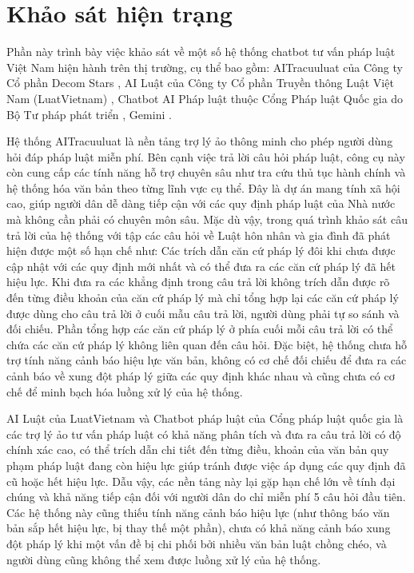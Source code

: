 \documentclass[../DoAn.tex]{subfiles}
\begin{document}
\section{Khảo sát hiện trạng}
\label{section:2.1}


Phần này trình bày việc khảo sát về một số hệ thống chatbot tư vấn pháp luật Việt Nam hiện hành trên thị trường, cụ thể bao gồm: AITracuuluat của Công ty Cổ phần Decom Stars \cite{AITracuuluatDoc}, AI Luật của Công ty Cổ phần Truyền thông Luật Việt Nam (LuatVietnam) \cite{AILuatLuatVietNamDoc}, Chatbot AI Pháp luật thuộc Cổng Pháp luật Quốc gia do Bộ Tư pháp phát triển \cite{PhapLuatGovChatbotDoc}, Gemini \cite{GeminiDoc}.


Hệ thống AITracuuluat là nền tảng trợ lý ảo thông minh cho phép người dùng hỏi đáp pháp luật miễn phí. Bên cạnh việc trả lời câu hỏi pháp luật, công cụ này còn cung cấp các tính năng hỗ trợ chuyên sâu như tra cứu thủ tục hành chính và hệ thống hóa văn bản theo từng lĩnh vực cụ thể. Đây là dự án mang tính xã hội cao, giúp người dân dễ dàng tiếp cận với các quy định pháp luật của Nhà nước mà không cần phải có chuyên môn sâu. Mặc dù vậy, trong quá trình khảo sát câu trả lời của hệ thống với tập các câu hỏi về Luật hôn nhân và gia đình đã phát hiện được một số hạn chế như: Các trích dẫn căn cứ pháp lý đôi khi chưa được cập nhật với các quy định mới nhất và có thể đưa ra các căn cứ pháp lý đã hết hiệu lực. Khi đưa ra các khẳng định trong câu trả lời không trích dẫn được rõ đến từng điều khoản của căn cứ pháp lý mà chỉ tổng hợp lại các căn cứ pháp lý được dùng cho câu trả lời ở cuối mẫu câu trả lời, người dùng phải tự so sánh và đối chiếu. Phần tổng hợp các căn cứ pháp lý ở phía cuối mỗi câu trả lời có thể chứa các căn cứ pháp lý không liên quan đến câu hỏi. Đặc biệt, hệ thống chưa hỗ trợ tính năng cảnh báo hiệu lực văn bản, không có cơ chế đối chiếu để đưa ra các cảnh báo về xung đột pháp lý giữa các quy định khác nhau và cũng chưa có cơ chế để minh bạch hóa luồng xử lý của hệ thống.


AI Luật của LuatVietnam và Chatbot pháp luật của Cổng pháp luật quốc gia là các trợ lý ảo tư vấn pháp luật có khả năng phân tích và đưa ra câu trả lời có độ chính xác cao, có thể trích dẫn chi tiết đến từng điều, khoản của văn bản quy phạm pháp luật đang còn hiệu lực giúp tránh được việc áp dụng các quy định đã cũ hoặc hết hiệu lực. Dẫu vậy, các nền tảng này lại gặp hạn chế lớn về tính đại chúng và khả năng tiếp cận đối với người dân do chỉ miễn phí 5 câu hỏi đầu tiên. Các hệ thống này cũng thiếu tính năng cảnh báo hiệu lực (như thông báo văn bản sắp hết hiệu lực, bị thay thế một phần), chưa có khả năng cảnh báo xung đột pháp lý khi một vấn đề bị chi phối bởi nhiều văn bản luật chồng chéo, và người dùng cũng không thể xem được luồng xử lý của hệ thống.
\end{document}

